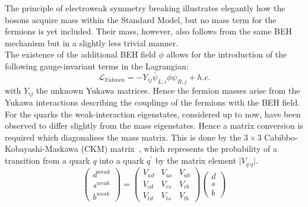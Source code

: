 The principle of electroweak symmetry breaking illustrates elegantly how the bosons acquire mass within the Standard Model, but no mass term for the fermions is yet included.
Their mass, however, also follows from the same BEH mechanism but in a slightly less trivial manner. %
\\
The existence of the additional BEH field $\phi$ allows for the introduction of the following gauge-invariant terms in the Lagrangian:
\begin{equation}
 \mathcal{L}_{Yukawa} = - Y_{ij} \bar{\psi}_{L,i} \phi \psi_{R,j} + h.c. 
\end{equation}
with $Y_{ij}$ the unknown Yukawa matrices. Hence the fermion masses arise from the Yukawa interactions describing the couplings of the fermions with the BEH field.
\\

For the quarks the weak-interaction eigenstates, considered up to now, have been observed to differ slightly from the mass eigenstates. Hence a matrix conversion is required which diagonalises the mass matrix. This is done by the $3 \times3$ Cabibbo-Kobayashi-Maskawa (CKM) matrix~\cite{?}, which represents the probability of a transition from a quark $q$ into a quark $q^{'}$ by the matrix element $\vert V_{q^{'}q} \vert$.
\begin{equation}
 \begin{pmatrix}
  d^{weak} \\ s^{weak} \\ b^{weak} 
 \end{pmatrix}
 = \begin{pmatrix}
    V_{ud} & V_{us} & V_{ub} \\ V_{cd} & V_{cs} & V_{cb} \\ V_{td} & V_{ts} & V_{tb}
   \end{pmatrix}
   \begin{pmatrix}
    d \\ s \\ b
   \end{pmatrix}
\end{equation}

